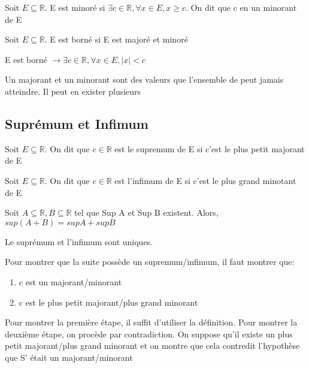 \documentclass{article}
\begin{document}
\begin{definition}[Minorant]
    Soit $E \subseteq \mathbb{R}$. E est minoré si $\exists c \in \mathbb{R}, \forall
    x \in E, x \geq c$. On dit que c en un minorant de E
\end{definition}

\begin{definition}
    Soit $E \subseteq \mathbb{R}$. E est borné si E est majoré et minoré
\end{definition}

\begin{proposition}
    E est borné $ \to \exists c \in \mathbb{R}, \forall x \in E, |x|<c $
\end{proposition}

\begin{remark}
    Un majorant et un minorant sont des valeurs que l'ensemble de peut jamais
    atteindre. Il peut en exister plusieurs
\end{remark}

\subsection{Suprémum et Infimum}

\begin{definition}[Supremum]
    Soit $E \subseteq \mathbb{R}$. On dit que $c \in \mathbb{R}$ est le supremum
    de E si c'est le plus petit majorant de E
\end{definition}

\begin{definition}[Infimum]
    Soit $E \subseteq \mathbb{R}$. On dit que $c \in \mathbb{R}$ est l'infimum
    de E si c'est le plus grand minotant de E
\end{definition}

\begin{proposition}
    Soit $ A \subseteq \mathbb{R}, B \subseteq \mathbb{R}$ tel que Sup A et Sup B
    existent. Alors, $sup(A+B)= sup A + sup B$
\end{proposition}

\begin{proposition}
    Le suprémum et l'infimum sont uniques.
\end{proposition}

\begin{problem}
    Pour montrer que la suite possède un supremum/infimum, il faut montrer que:
    \begin{enumerate}
	\item c est un majorant/minorant
	\item c est le plus petit majorant/plus grand minorant
    \end{enumerate}

    Pour montrer la première étape, il suffit d'utiliser la définition. Pour
    montrer la deuxième étape, on procède par contradiction. On suppose qu'il
    existe un plus petit majorant/plus grand minorant et on montre que cela
    contredit l'hypothèse que S' était un majorant/minorant

\end{problem}
\end{document}
